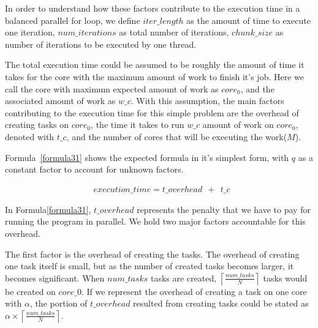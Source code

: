 In order to understand how these factors contribute to the execution time in a balanced parallel for loop, we define $iter\_{length}$ as the amount of time to execute one iteration, $num\_{iterations}$ as total number of iterations, $chunk\_{size}$ as number of iterations to be executed by one thread.


The total execution time could be assumed to be roughly the amount of time it takes for the core with the maximum amount of work to finish it's job. Here we call the core with maximum expected amount of work as $core_0$, and the associated amount of work as $w\_c$. 
With this assumption, the main factors contributing to the execution time for this simple problem are the overhead of creating tasks on $core_0$, the time it takes to run $w\_c$ amount of work on $core_0$, denoted with $t\_{c}$, and the number of cores that will be executing the work($M$). 


Formula~\ref{formula31} shows the expected formula in it's simplest form, with $q$ as a constant factor to account for unknown factors.  

\begin{equation}\label{formula31}
\begin{aligned}
&execution\_time = 
t\_{overhead}\:\:+\:\:t\_c\
\end{aligned}
\end{equation}


In Formula\ref{formula31}, $t\_{overhead}$ represents the penalty that we have to pay for running the program in parallel. We hold two major factors accountable for this overhead. 

The first factor is the overhead of creating the tasks. The overhead of creating one task itself is small, but as the number of created tasks becomes larger, it becomes significant.
When $num\_{tasks}$ tasks are created, $\left\lceil{\frac{num\_{tasks}}{N}}\right \rceil$ tasks would be created on $core\_0$. If we represent the overhead of creating a task on one core with $\alpha$, the portion of $t\_{overhead}$ resulted from creating tasks could be stated as $\alpha\times{\left\lceil{\frac{num\_{tasks}}{N}}\right \rceil}$.


